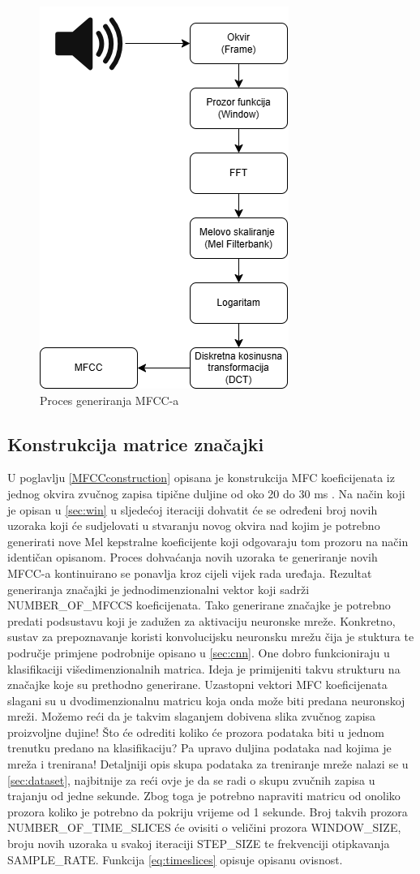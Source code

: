 \begin{figure}[htb]
    \centering
    \includegraphics[width=0.4\linewidth]{Chapters/struktura_sustava/generiranje_znacajki/generation.png} 
    \caption{Proces generiranja MFCC-a \cite{flowchart}}
    \label{pic:generation}
\end{figure}

\subsection{Konstrukcija matrice značajki}
\label{sec:featureImage}
U poglavlju \ref{MFCCconstruction} opisana je konstrukcija MFC koeficijenata iz jednog
okvira zvučnog zapisa tipične duljine od oko 20 do 30 ms \cite{wardentinyml}. 
Na način koji je opisan u
\ref{sec:win} u sljedećoj iteraciji dohvatit će se određeni broj novih uzoraka koji će
sudjelovati u stvaranju novog okvira nad kojim je 
potrebno generirati nove Mel kepstralne koeficijente koji odgovaraju tom prozoru na način
identičan opisanom. Proces dohvaćanja novih uzoraka te generiranje novih MFCC-a kontinuirano
se ponavlja kroz cijeli vijek rada uređaja. Rezultat generiranja značajki je 
jednodimenzionalni vektor koji sadrži NUMBER\_OF\_MFCCS koeficijenata. Tako generirane značajke
je potrebno predati podsustavu koji je zadužen za aktivaciju neuronske mreže. Konkretno,
sustav za prepoznavanje koristi konvolucijsku neuronsku mrežu čija je stuktura te 
područje primjene podrobnije opisano u \ref{sec:cnn}. One dobro funkcioniraju u klasifikaciji
višedimenzionalnih matrica. Ideja je primijeniti takvu strukturu na značajke koje su prethodno
generirane. Uzastopni vektori MFC koeficijenata slagani su u dvodimenzionalnu matricu koja
onda može biti predana neuronskoj mreži. Možemo reći da je takvim slaganjem dobivena slika
zvučnog zapisa proizvoljne dujine! Što će odrediti koliko će prozora podataka biti u jednom 
trenutku predano na klasifikaciju? Pa upravo duljina podataka nad kojima je mreža i trenirana!
Detaljniji opis skupa podataka za treniranje mreže nalazi se u \ref{sec:dataset}, najbitnije
za reći ovje je da se radi o skupu zvučnih zapisa u trajanju od jedne sekunde. Zbog toga
je potrebno napraviti matricu od onoliko prozora koliko je potrebno da pokriju
vrijeme od 1 sekunde. Broj takvih prozora NUMBER\_OF\_TIME\_SLICES će ovisiti
o veličini prozora WINDOW\_SIZE,
broju novih uzoraka u svakoj iteraciji STEP\_SIZE te frekvenciji otipkavanja
SAMPLE\_RATE. Funkcija \ref{eq:timeslices} opisuje opisanu ovisnost.

